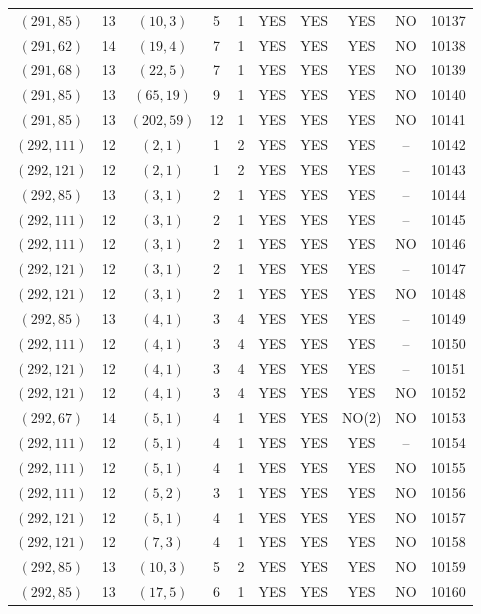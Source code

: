 \begin{longtable}{|c|c|c|c|c|c|c|c|c|c|}
$(291, 85)$ & 13 & $(10, 3)$ & 5 & 1 & YES & YES & YES & NO & 10137\\
$(291, 62)$ & 14 & $(19, 4)$ & 7 & 1 & YES & YES & YES & NO & 10138\\
$(291, 68)$ & 13 & $(22, 5)$ & 7 & 1 & YES & YES & YES & NO & 10139\\
$(291, 85)$ & 13 & $(65, 19)$ & 9 & 1 & YES & YES & YES & NO & 10140\\
$(291, 85)$ & 13 & $(202, 59)$ & 12 & 1 & YES & YES & YES & NO & 10141\\
$(292, 111)$ & 12 & $(2, 1)$ & 1 & 2 & YES & YES & YES & -- & 10142\\
$(292, 121)$ & 12 & $(2, 1)$ & 1 & 2 & YES & YES & YES & -- & 10143\\
$(292, 85)$ & 13 & $(3, 1)$ & 2 & 1 & YES & YES & YES & -- & 10144\\
$(292, 111)$ & 12 & $(3, 1)$ & 2 & 1 & YES & YES & YES & -- & 10145\\
$(292, 111)$ & 12 & $(3, 1)$ & 2 & 1 & YES & YES & YES & NO & 10146\\
$(292, 121)$ & 12 & $(3, 1)$ & 2 & 1 & YES & YES & YES & -- & 10147\\
$(292, 121)$ & 12 & $(3, 1)$ & 2 & 1 & YES & YES & YES & NO & 10148\\
$(292, 85)$ & 13 & $(4, 1)$ & 3 & 4 & YES & YES & YES & -- & 10149\\
$(292, 111)$ & 12 & $(4, 1)$ & 3 & 4 & YES & YES & YES & -- & 10150\\
$(292, 121)$ & 12 & $(4, 1)$ & 3 & 4 & YES & YES & YES & -- & 10151\\
$(292, 121)$ & 12 & $(4, 1)$ & 3 & 4 & YES & YES & YES & NO & 10152\\
$(292, 67)$ & 14 & $(5, 1)$ & 4 & 1 & YES & YES & NO(2) & NO & 10153\\
$(292, 111)$ & 12 & $(5, 1)$ & 4 & 1 & YES & YES & YES & -- & 10154\\
$(292, 111)$ & 12 & $(5, 1)$ & 4 & 1 & YES & YES & YES & NO & 10155\\
$(292, 111)$ & 12 & $(5, 2)$ & 3 & 1 & YES & YES & YES & NO & 10156\\
$(292, 121)$ & 12 & $(5, 1)$ & 4 & 1 & YES & YES & YES & NO & 10157\\
$(292, 121)$ & 12 & $(7, 3)$ & 4 & 1 & YES & YES & YES & NO & 10158\\
$(292, 85)$ & 13 & $(10, 3)$ & 5 & 2 & YES & YES & YES & NO & 10159\\
$(292, 85)$ & 13 & $(17, 5)$ & 6 & 1 & YES & YES & YES & NO & 10160\\

\end{longtable}
